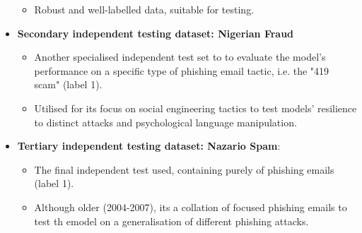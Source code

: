 \begin{itemize}
\begin{itemize}
    \item Robust and well-labelled data, suitable for testing.
  \end{itemize}
  \item \textbf{Secondary independent testing dataset: Nigerian Fraud}
  \begin{itemize}
    \item Another specialised independent test set to to evaluate the model's performance on a specific type of phishing email tactic, i.e. the "419 scam" (label 1).
    \item Utilised for its focus on social engineering tactics to test models' resilience to distinct attacks and psychological language manipulation.
  \end{itemize}
  \item \textbf{Tertiary independent testing dataset: Nazario Spam}:
  \begin{itemize}
    \item The final independent test used, containing purely of phishing emails (label 1).
    \item Although older (2004-2007), its a collation of focused phishing emails to test th emodel on a generalisation of different phishing attacks.
  \end{itemize}
\end{itemize}

